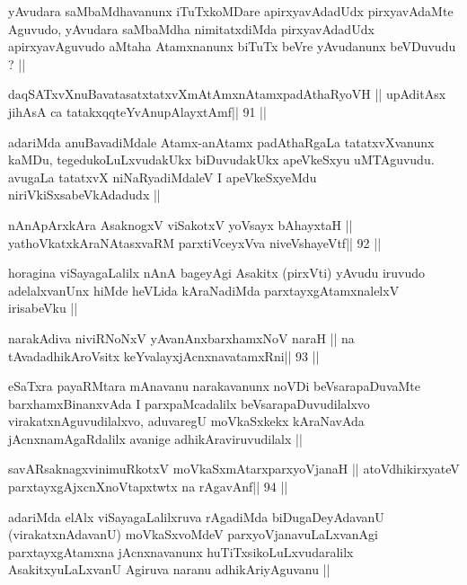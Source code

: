 \begin{artha}
yAvudara saMbaMdhavanunx iTuTxkoMDare apirxyavAdadUdx pirxyavAdaMte
Aguvudo, yAvudara saMbaMdha nimitatxdiMda pirxyavAdadUdx
apirxyavAguvudo aMtaha Atamxnanunx biTuTx beVre yAvudanunx beVDuvudu ? ||
\end{artha}


\begin{shl}
daqSATxvX\s nuBavatasatxtatxvXmAtAmxnAtamxpadAthaRyoVH ||
upAditAsx jihAsA ca tatakxqqteYvAnupAlayxtAmf\hfill || 91 ||
\end{shl}

\begin{artha}
adariMda anuBavadiMdale Atamx-anAtamx padAthaRgaLa tatatxvXvanunx kaMDu,
tegedukoLuLxvudakUkx biDuvudakUkx apeVkeSxyu uMTAguvudu. avugaLa
tatatxvX niNaRyadiMdaleV I apeVkeSxyeMdu niriVkiSxsabeVkAdadudx ||
\end{artha}

\begin{shl}
nAnApArxkAra AsaknogxV viSakotxV yoV\s sayx bAhayxtaH ||
yathoVkatxkAraNAtasxvaRM parxtiVceyxVva niveVshayeVtf\hfill || 92 ||
\end{shl}

\begin{artha}
horagina viSayagaLalilx nAnA bageyAgi Asakitx (pirxVti) yAvudu iruvudo
adelalxvanUnx hiMde heVLida kAraNadiMda parxtayxgAtamxnalelxV
irisabeVku ||
\end{artha}

\begin{shl}
narakAdiva niviRNoNxV yAvanAnx\s\s  barxhamxNoV naraH ||
na tAvadadhikAroV\s sitx keYvalayxjAcnxnavatamxRni\hfill || 93 ||
\end{shl}

\begin{artha}
eSaTxra payaRMtara mAnavanu narakavanunx noVDi beVsarapaDuvaMte
barxhamxBinanxvAda I parxpaMcadalilx beVsarapaDuvudilalxvo
virakatxnAguvudilalxvo, aduvaregU moVkaSxkekx kAraNavAda
jAcnxnamAgaRdalilx avanige adhikAraviruvudilalx ||
\end{artha}

\begin{shl}
savARsaknagxvinimuRkotxV moVkaSxmAtarxparxyoVjanaH ||
atoV\s dhikirxyateV parxtayxgAjxcnXnoVtapxtwtx na rAgavAnf\hfill || 94 ||
\end{shl}

\begin{artha}
adariMda elAlx viSayagaLalilxruva rAgadiMda biDugaDeyAdavanU
(virakatxnAdavanU) moVkaSxvoMdeV parxyoVjanavuLaLxvanAgi
parxtayxgAtamxna jAcnxnavanunx huTiTxsikoLuLxvudaralilx
AsakitxyuLaLxvanU Agiruva naranu adhikAriyAguvanu ||
\end{artha}

